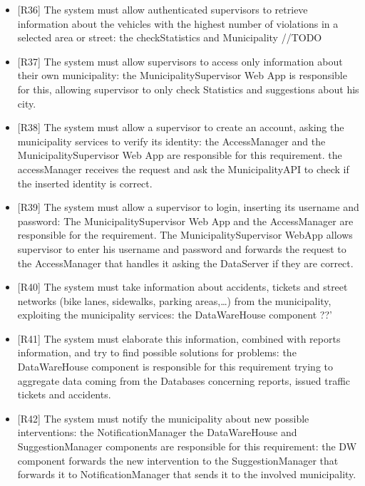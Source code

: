 \documentclass[a4paper]{report}
\begin{document}
\begin{itemize}
\item {[R36]}	\label{R36}The system must allow authenticated supervisors to retrieve information about the vehicles with the highest number of violations in a selected area or street: the checkStatistics and Municipality //TODO 
\item {[R37]}	\label{R37}The system must allow supervisors to access only information about their own municipality: the MunicipalitySupervisor Web App  is responsible for this, allowing supervisor to only check Statistics and suggestions about his city. 
\item {[R38]}	\label{R38}The system must allow a supervisor to create an account, asking the municipality services to verify its identity: the AccessManager and the MunicipalitySupervisor Web App are responsible for this requirement. the accessManager receives the request and ask the MunicipalityAPI to check if the inserted identity is correct.
\item {[R39]}	\label{R39}The system must allow a supervisor to login, inserting its username and password: The MunicipalitySupervisor Web App and the AccessManager are responsible for the requirement. The MunicipalitySupervisor WebApp allows supervisor to enter his username and password and forwards the request to the AccessManager that handles it asking the DataServer if they are correct.
\item {[R40]}	\label{R40}The system must take information about accidents, tickets and street networks (bike lanes, sidewalks, parking areas,…) from the municipality, exploiting the municipality services: the DataWareHouse component ??'
\item {[R41]}	\label{R41}The system must elaborate this information, combined with reports information, and try to find possible solutions for problems: the DataWareHouse component is responsible for this requirement trying to aggregate data coming from the Databases concerning reports, issued traffic tickets and accidents.
\item {[R42]}	\label{R42}The system must notify the municipality about new possible interventions: the NotificationManager the DataWareHouse and SuggestionManager components are responsible for this requirement: the DW component forwards the new intervention to the SuggestionManager that forwards it to NotificationManager that sends it to  the involved municipality.
\end{itemize}
\end{document}
